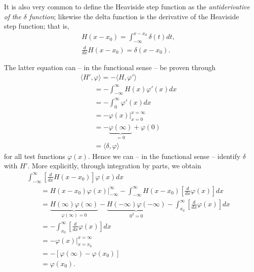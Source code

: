 It is also very common to define the  Heaviside step function as the
{\em antiderivative  of the $\delta$ function};
likewise the delta function is the derivative of the Heaviside step function; that is,
\begin{equation}
\begin{split}
H(x-x_0)
=
\int_{-\infty}^{x-x_0} \delta (t) dt,\\
\frac{d}{dx} H(x-x_0)=\delta (x-x_0).
\end{split}
\end{equation}

{\color{OliveGreen}
\bproof
The latter equation can
-- in the functional sense  --
be proven through
\begin{equation}
\begin{split}
\langle   H' , \varphi   \rangle = - \langle  H ,  \varphi'   \rangle      \\
\qquad =
-\int_{-\infty}^\infty H(x) \varphi' (x)  dx \\
\qquad =
-\int_{0}^\infty  \varphi' (x)  dx \\
\qquad =
-\left.   \varphi  (x) \right|_{x=0}^{x= \infty}   \\
\qquad =
 -   \underbrace{\varphi  (\infty)}_{=0} +  \varphi  (0)
\\
\qquad =    \langle   \delta , \varphi  \rangle
\end{split}
\end{equation}
for all test functions $\varphi (x)$. Hence we can -- in the functional sense  -- identify $\delta$ with $H'$.
More explicitly, through integration by parts, we obtain
\begin{equation}
\begin{split}
\int _{-\infty}^\infty \left[\frac{d}{dx} H(x-x_0)\right] \varphi (x) dx       \\
\qquad =
\left. H(x-x_0) \varphi (x)\right| _{-\infty}^\infty - \int _{-\infty}^\infty H(x-x_0) \left[\frac{d}{dx} \varphi (x)\right] dx \\
\qquad =
\underbrace{H(\infty)\varphi(\infty)}_{\varphi(\infty)=0} - \underbrace{H(-\infty)\varphi(-\infty)}_{0^2=0}
   - \int _{x_0}^\infty \left[\frac{d}{dx} \varphi (x)\right] dx  \\
\qquad =  - \int _{x_0}^\infty \left[\frac{d}{dx} \varphi (x)\right] dx \\
\qquad =    -  \left.  \varphi (x)   \right| _{x=x_0}^{x= \infty} \\
\qquad =    - [  \varphi (\infty)  - \varphi (x_0)] \\
\qquad =     \varphi (x_0).
\end{split}
\end{equation}


\eproof
}

